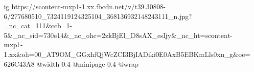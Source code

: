  
 
 
 
 

\ifcmt
  ig https://scontent-mxp1-1.xx.fbcdn.net/v/t39.30808-6/277680510_7324119124325104_368136932148243111_n.jpg?_nc_cat=111&ccb=1-5&_nc_sid=730e14&_nc_ohc=2zkBjEl_D8sAX_esIjy&_nc_ht=scontent-mxp1-1.xx&oh=00_AT9OM_GGxhfQjWcZCI3BjIADiki0E0AxB5EBKmLls0xn_g&oe=626C43A8
  @width 0.4
  @minipage 0.4
  @wrap \parpic[r]
\fi
